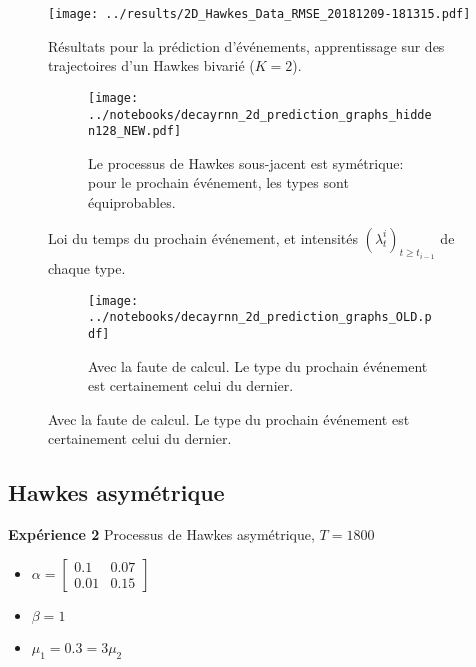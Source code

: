 \documentclass{beamer}
\begin{document}
\begin{frame}
\begin{figure}
	\centering
	\texttt{[image: ../results/2D\_Hawkes\_Data\_RMSE\_20181209-181315.pdf]}
	\caption{Résultats pour la prédiction d'événements, apprentissage sur des trajectoires d'un Hawkes bivarié ($K=2$).}
\end{figure}
\end{frame}

\begin{frame}
\begin{figure}
	\begin{subfigure}{\linewidth}
		\texttt{[image: ../notebooks/decayrnn\_2d\_prediction\_graphs\_hidden128\_NEW.pdf]}
		\caption{Le processus de Hawkes sous-jacent est symétrique: pour le prochain événement, les types sont équiprobables.}
	\end{subfigure}
	\caption{Loi du temps du prochain événement, et intensités $(\lambda^i_t)_{t\geq t_{i-1}}$ de chaque type.}
\end{figure}
\end{frame}

\begin{frame}
\begin{figure}\ContinuedFloat
	\begin{subfigure}{\linewidth}
		\texttt{[image: ../notebooks/decayrnn\_2d\_prediction\_graphs\_OLD.pdf]}
		\caption{Avec la faute de calcul. Le type du prochain événement est certainement celui du dernier.}
	\end{subfigure}
\end{figure}
\end{frame}

\subsection{Hawkes asymétrique}

\begin{frame}
\textbf{Expérience 2} Processus de Hawkes asymétrique, $T = 1800$
\begin{itemize}
	\item $\alpha = \begin{bmatrix}0.1 & 0.07\\ 0.01 & 0.15\end{bmatrix}$
	\item $\beta = 1$
	\item $\mu_1 = \num{0.3} = 3\mu_2$
\end{itemize}
\end{frame}
\end{document}
